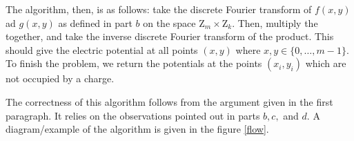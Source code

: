 \documentclass[psamsfonts]{amsart}
\newenvironment{sol}{{\bfseries Solution}}{\qedsymbol}
\theoremstyle{definition}
\theoremstyle{remark}
\numberwithin{equation}{section}
\begin{document}
\begin{sol}
The algorithm, then, is as follows: take the discrete Fourier transform of $f(x,y)$ ad $g(x,y)$ as defined in part $b$ on the space $\mathrm{Z}_m \times \mathrm{Z}_k$. Then, multiply the together, and take the inverse discrete Fourier transform of the product. This should give the electric potential at all points $(x,y)$ where $x,y \in \{0, \ldots, m-1\}$. To finish the problem, we return the potentials at the points $(x_i, y_i)$ which are not occupied by a charge. 

The correctness of this algorithm follows from the argument given in the first paragraph. It relies on the observations pointed out in parts $b,c,$ and $d$. A diagram/example of the algorithm is given in the figure \ref{flow}.

\end{sol}
\end{document}

